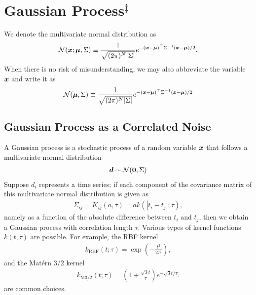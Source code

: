 \section{Gaussian Process$^\ddagger$}
We denote the multivariate normal distribution as 
\begin{align}
    \mathcal{N}(\boldsymbol{x};\boldsymbol{\mu}, \Sigma) \equiv \dfrac{1}{\sqrt{(2 \pi)^{N} |\Sigma|}} e^{- (\boldsymbol{x} - \boldsymbol{\mu})^\top \Sigma^{-1}(\boldsymbol{x} - \boldsymbol{\mu}) /2  }.
\end{align}
When there is no risk of misunderstanding, we may also abbreviate the variable $\boldsymbol{x}$ and write it as
\begin{align}
    \mathcal{N}(\boldsymbol{\mu}, \Sigma) \equiv \dfrac{1}{\sqrt{(2 \pi)^{N} |\Sigma|}} e^{- (\boldsymbol{x} - \boldsymbol{\mu})^\top \Sigma^{-1}(\boldsymbol{x} - \boldsymbol{\mu}) /2  }
\end{align}

\subsection*{Gaussian Process as a Correlated Noise}

A Gaussian process is a stochastic process of a random variable $\boldsymbol{x}$ that follows a multivariate normal distribution
\begin{align}
\boldsymbol{d} \sim \mathcal{N}(\boldsymbol{0},\Sigma)
\end{align}
Suppose $d_i$ represents a time series; if each component of the covariance matrix of this multivariate normal distribution is given as
\begin{align}
\Sigma_{ij} = K_{ij}(a, \tau) = a k(|t_i-t_j|; \tau),
\end{align}
namely as a function of the absolute difference between $t_i$ and $t_j$, then we obtain a Gaussian process with correlation length $\tau$.
Various types of kernel functions $k(t,\tau)$ are possible. For example, the RBF kernel
\begin{align}
 k_\mathrm{RBF}(t;\tau) = \exp{\left(- \frac{t^2}{2 \tau^2} \right)},
\end{align}
and the Mat\'{e}rn 3/2 kernel
\begin{align}
\label{eq:MaternA}
 k_\mathrm{M3/2}(t;\tau) = \left( 1 + \frac{\sqrt{3} t}{\tau} \right) e^{- \sqrt{3} t/\tau}. 
\end{align}
are common choices.

